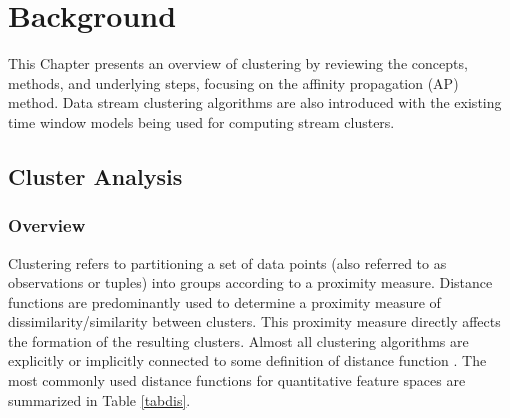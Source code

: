 \setlength{\parindent}{2em}
% 
\chapter{Background}


This Chapter presents an overview of clustering by reviewing the concepts, methods, and underlying steps, focusing on the affinity propagation (AP) method. Data stream clustering algorithms are also introduced with the existing time window models being used for computing stream clusters. 





\section{Cluster Analysis}

\subsection{Overview}
Clustering refers to partitioning a set of data points (also referred to as observations or tuples) into groups according to a proximity measure. Distance functions are predominantly used to determine a proximity measure of dissimilarity/similarity between clusters.  This proximity measure directly affects the formation of the resulting clusters. Almost all clustering algorithms are explicitly or implicitly connected to some definition of distance function \cite{zumel2014practical}. The most commonly used distance functions for quantitative feature spaces are summarized in Table \ref{tabdis}. 





